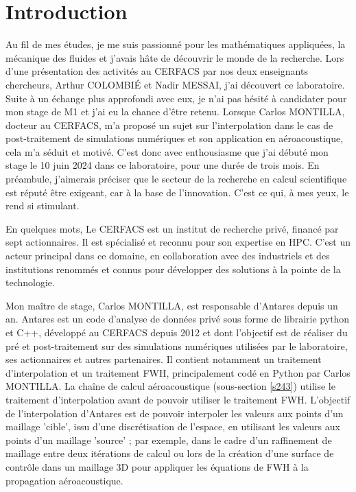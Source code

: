 \section*{Introduction}

Au fil de mes études, je me suis passionné pour les mathématiques appliquées, la mécanique des fluides et j’avais hâte de découvrir le monde de la recherche. Lors d’une présentation des activités au \ac{CERFACS} par nos deux enseignants chercheurs, Arthur COLOMBIÉ et Nadir MESSAI, j’ai découvert ce laboratoire. Suite à un échange plus approfondi avec eux,  je n’ai pas hésité à candidater pour mon stage de M1 et j’ai eu la chance d’être retenu.
Lorsque Carlos MONTILLA, docteur au CERFACS, m’a proposé un sujet sur l’interpolation dans le cas de post-traitement de simulations numériques et son application en aéroacoustique, cela m’a séduit et motivé. C’est donc avec enthousiasme que j’ai débuté mon stage le 10 juin 2024 dans ce laboratoire, pour une durée de trois mois.
En préambule, j’aimerais préciser que le secteur de la recherche en calcul scientifique est réputé être exigeant, car à la base de l’innovation. C’est ce qui, à mes yeux, le rend si stimulant.

En quelques mots, Le CERFACS est un institut de recherche privé, financé par sept actionnaires. Il est spécialisé et reconnu pour son expertise en \ac{HPC}. C’est un acteur principal dans ce domaine, en collaboration avec des industriels et des institutions renommés et connus pour développer des solutions à la pointe de la technologie.

Mon maître de stage, Carlos MONTILLA, est responsable d’Antares \cite{antares} depuis un an. Antares est un code d’analyse de données privé sous forme de librairie python et C++, développé au CERFACS depuis 2012 et dont l’objectif est de réaliser du pré et post-traitement sur des simulations numériques utilisées par le laboratoire, ses actionnaires et autres partenaires. Il contient notamment un traitement d’interpolation et un traitement \ac{FWH}, principalement codé en Python par Carlos MONTILLA. La chaîne de calcul aéroacoustique (sous-section \ref{s243}) utilise le traitement d’interpolation avant de pouvoir utiliser le traitement FWH. L’objectif de l’interpolation d’Antares est de pouvoir interpoler les valeurs aux points d’un maillage ’cible’, issu d’une discrétisation de l’espace, en utilisant les valeurs aux points d’un maillage ’source’ ; par exemple, dans le cadre d’un raffinement de maillage entre deux itérations de calcul ou lors de la création d’une surface de contrôle dans un maillage 3D pour appliquer les équations de FWH à la propagation aéroacoustique.

